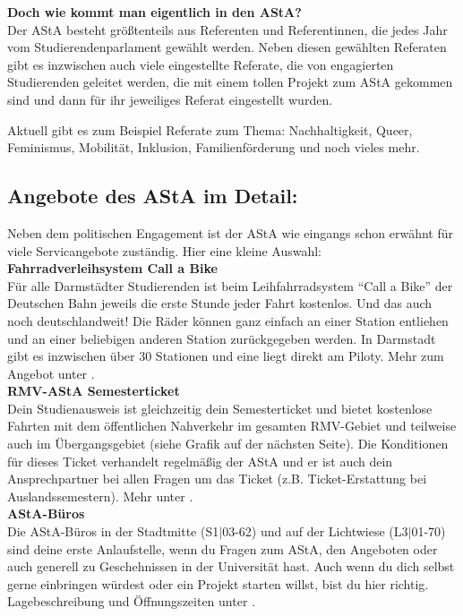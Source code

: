 {    


    \noindent\textbf{Doch wie kommt man eigentlich in den AStA?}\\
    Der AStA besteht größtenteils aus Referenten und Referentinnen, die jedes Jahr vom Studierendenparlament gewählt werden. Neben diesen gewählten Referaten gibt es inzwischen auch viele eingestellte Referate, die von engagierten Studierenden geleitet werden, die mit einem tollen Projekt zum AStA gekommen sind und dann für ihr jeweiliges Referat eingestellt wurden.

    Aktuell gibt es zum Beispiel Referate zum Thema: Nachhaltigkeit, Queer, Feminismus, Mobilität, Inklusion, Familienförderung und noch vieles mehr.\\
    \columnbreak

    \subsection*{Angebote des AStA im Detail:}

    Neben dem politischen Engagement ist der AStA wie eingangs schon erwähnt für viele Servicangebote zuständig. Hier eine kleine Auswahl:\\

    \noindent\textbf{Fahrradverleihsystem Call a Bike}\\
    Für alle Darmstädter Studierenden ist beim Leihfahrradsystem "`Call a Bike"' der Deutschen Bahn jeweils die erste Stunde jeder Fahrt kostenlos. Und das auch noch deutschlandweit! Die Räder können ganz einfach an einer Station entliehen und an einer beliebigen anderen Station zurückgegeben werden. In Darmstadt gibt es inzwischen über 30 Stationen und eine liegt direkt am Piloty. Mehr zum Angebot unter \footnotemark[1].\\

    \noindent\textbf{RMV-AStA Semesterticket}\\
    Dein Studienausweis ist gleichzeitig dein Semesterticket und bietet kostenlose Fahrten mit dem öffentlichen Nahverkehr im gesamten RMV-Gebiet und teilweise auch im Übergangsgebiet (siehe Grafik auf der nächsten Seite). Die Konditionen für dieses Ticket verhandelt regelmäßig der AStA und er ist auch dein Ansprechpartner bei allen Fragen um das Ticket (z.B. Ticket-Erstattung bei Auslandssemestern). Mehr unter \footnotemark[2].\\

    \noindent\textbf{AStA-Büros}\\
    Die AStA-Büros in der Stadtmitte (S1$|$03-62) und auf der Lichtwiese (L3$|$01-70) sind deine erste Anlaufstelle, wenn du Fragen zum AStA, den Angeboten oder auch generell zu Geschehnissen in der Universität hast. Auch wenn du dich selbst gerne einbringen würdest oder ein Projekt starten willst, bist du hier richtig. Lagebeschreibung und Öffnungszeiten unter \footnotemark[3].\\

}
